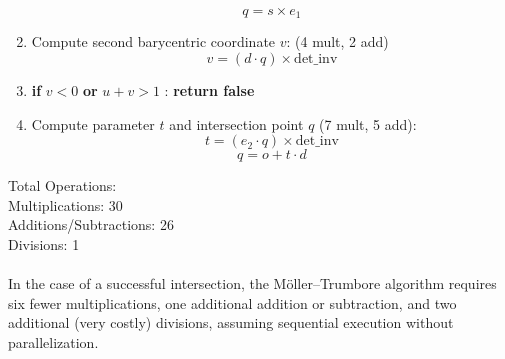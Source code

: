 \documentclass{article}
\begin{document}
\begin{enumerate}
    \begin{equation*}
        q = s \times e_1
    \end{equation*}
    \item Compute second barycentric coordinate  $v$:  (4 mult, 2 add)
        \begin{equation*}
            v = (d \cdot q) \times \text{det\_inv}
        \end{equation*}
    \item \textbf{if } $v < 0$ \textbf{or} $u+v > 1$ : \textbf{return false}
    \item Compute parameter $t$ and intersection point $q$ (7 mult, 5 add):
        \begin{equation*}
            t = (e_2 \cdot q) \times \text{det\_inv}
        \end{equation*}
        \begin{equation*}
                q = o + t \cdot d
        \end{equation*}
\end{enumerate}

Total Operations: \\
Multiplications: 30\\
Additions/Subtractions: 26\\
Divisions: 1\\
\\
In the case of a successful intersection, the Möller–Trumbore algorithm requires six fewer multiplications,  one additional addition or subtraction, and two additional (very costly) divisions, assuming sequential execution without parallelization.
\end{document}
